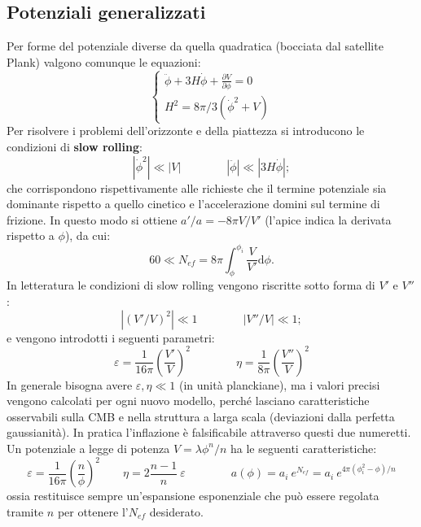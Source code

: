 \subsection{Potenziali generalizzati}
Per forme del potenziale diverse da quella quadratica (bocciata dal satellite Plank) valgono comunque le equazioni:
\begin{equation*}
    \left\{\begin{matrix}
        \ddot{\phi} + 3H \dot{\phi} + \frac{\partial V}{\partial \phi} =0\\ 
        H^2 = 8\pi /3 \left(\dot{\phi}^2+V\right)
       \end{matrix}\right.
\end{equation*}
Per risolvere i problemi dell'orizzonte e della piattezza si introducono le condizioni di \textbf{slow rolling}:
\begin{equation}
    \left| \dot{\phi}^2 \right| \ll \left| V \right|  \qquad\qquad \left| \ddot{\phi} \right| \ll \left| 3H\dot{\phi} \right|;
\end{equation}
che corrispondono rispettivamente alle richieste che il termine potenziale sia dominante rispetto a quello cinetico e l'accelerazione domini sul termine di frizione. In questo modo si ottiene $a'/a = -8\pi V/V'$ (l'apice indica la derivata rispetto a $\phi$), da cui:
\begin{equation}
    60 \ll N_{ef} = 8\pi \int_\phi^{\phi_i} \frac{V}{V'} \mathrm{d}\phi. 
\end{equation}
In letteratura le condizioni di slow rolling vengono riscritte sotto forma di $V'$ e $V''$:
\begin{equation}
    \left| \left( V'/V\right)^2 \right| \ll 1 \qquad\qquad \left|  V''/V \right| \ll 1;
\end{equation}
e vengono introdotti i seguenti parametri:
\begin{equation}
    \varepsilon = \frac{1}{16\pi}\left(\frac{V'}{V}\right)^2 \qquad\qquad \eta = \frac{1}{8\pi}\left(\frac{V''}{V}\right)^2
\end{equation}
In generale bisogna avere $\varepsilon, \eta \ll 1$ (in unità planckiane), ma i valori precisi vengono calcolati per ogni nuovo modello, perché lasciano caratteristiche osservabili sulla CMB e nella struttura a larga scala (deviazioni dalla perfetta gaussianità). In pratica l'inflazione è falsificabile attraverso questi due numeretti. Un potenziale a legge di potenza $V=\lambda \phi^n / n$ ha le seguenti caratteristiche:
\begin{equation}
    \varepsilon =   \frac{1}{16\pi} \left( \frac{n}{\phi}\right)^2 \qquad \eta= 2 \frac{n-1}{n} ~\varepsilon \qquad\qquad a(\phi)=a_i ~e^{N_{ef}} = a_i ~e^{4\pi(\phi_i^2-\phi)/n}
\end{equation}
ossia restituisce sempre un'espansione esponenziale che può essere regolata tramite $n$ per ottenere l'$N_{ef}$ desiderato.

